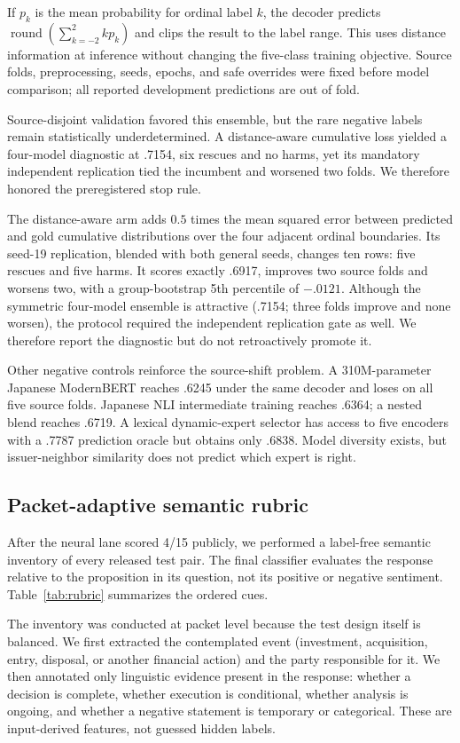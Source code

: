 \documentclass[11pt]{article}
\begin{document}
If $p_k$ is the mean probability for ordinal label $k$, the decoder predicts
$\operatorname{round}(\sum_{k=-2}^{2} k p_k)$ and clips the result to the label
range.  This uses distance information at inference without changing the
five-class training objective.  Source folds, preprocessing, seeds, epochs,
and safe overrides were fixed before model comparison; all reported
development predictions are out of fold.

Source-disjoint validation favored this ensemble, but the rare negative labels remain statistically underdetermined. A distance-aware cumulative loss yielded a four-model diagnostic at .7154, six rescues and no harms, yet its mandatory independent replication tied the incumbent and worsened two folds. We therefore honored the preregistered stop rule.

The distance-aware arm adds $0.5$ times the mean squared error between predicted
and gold cumulative distributions over the four adjacent ordinal boundaries.
Its seed-19 replication, blended with both general seeds, changes ten rows: five
rescues and five harms.  It scores exactly .6917, improves two source folds and
worsens two, with a group-bootstrap 5th percentile of $-.0121$.  Although the
symmetric four-model ensemble is attractive (.7154; three folds improve and
none worsen), the protocol required the independent replication gate as well.
We therefore report the diagnostic but do not retroactively promote it.

Other negative controls reinforce the source-shift problem.  A 310M-parameter
Japanese ModernBERT reaches .6245 under the same decoder and loses on all five
source folds.  Japanese NLI intermediate training reaches .6364; a nested
blend reaches .6719.  A lexical dynamic-expert selector has access to five
encoders with a .7787 prediction oracle but obtains only .6838.  Model diversity
exists, but issuer-neighbor similarity does not predict which expert is right.

\subsection{Packet-adaptive semantic rubric}
After the neural lane scored 4/15 publicly, we performed a label-free semantic inventory of every released test pair. The final classifier evaluates the response relative to the proposition in its question, not its positive or negative sentiment. Table~\ref{tab:rubric} summarizes the ordered cues.

The inventory was conducted at packet level because the test design itself is
balanced.  We first extracted the contemplated event (investment, acquisition,
entry, disposal, or another financial action) and the party responsible for it.
We then annotated only linguistic evidence present in the response: whether a
decision is complete, whether execution is conditional, whether analysis is
ongoing, and whether a negative statement is temporary or categorical.  These
are input-derived features, not guessed hidden labels.
\end{document}
